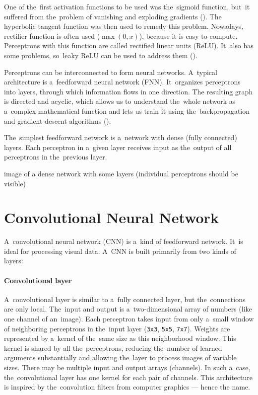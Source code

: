 One of the~first activation functions to be used was the~sigmoid function, but~it suffered from the~problem of vanishing and exploding gradients (\cite{VanishingGradient}). The hyperbolic tangent function was then used to remedy this problem. Nowadays, rectifier function is often used ($\max(0, x)$), because it is easy to compute. Perceptrons with this function are called rectified linear units (ReLU). It~also has some problems, so~leaky ReLU can be used to address them (\cite{Maas2013RectifierNI}).

Perceptrons can be interconnected to form neural networks. A~typical architecture is a~feedforward neural network (FNN). It~organizes perceptrons into layers, through which information flows in one direction. The resulting graph is directed and acyclic, which allows us to understand the~whole network as a~complex mathematical function and lets us train it using the~backpropagation and gradient descent algorithms (\cite{Goodfellow-et-al-2016}).

The~simplest feedforward network is a~network with dense (fully connected) layers. Each perceptron in a~given layer receives input as the~output of all perceptrons in the~previous layer.

\begin{code}
image of a dense network with some layers
(individual perceptrons should be visible)
\end{code}


\section{Convolutional Neural Network}

A~convolutional neural network (CNN) is a~kind of feedforward network. It~is ideal for processing visual data. A~CNN is built primarily from two kinds of layers:

\paragraph{Convolutional layer} A~convolutional layer is similar to a~fully connected layer, but the~connections are only local. The~input and output is a~two-dimensional array of numbers (like one channel of an~image). Each perceptron takes input from only a~small window of neighboring perceptrons in the~input layer (\texttt{3x3}, \texttt{5x5}, \texttt{7x7}). Weights are represented by a~kernel of the~same size as this neighborhood window. This kernel is shared by all the~perceptrons, reducing the~number of learned arguments substantially and allowing the~layer to process images of variable sizes. There may be multiple input and output arrays (channels). In such a~case, the~convolutional layer has one kernel for each pair of channels. This architecture is inspired by the~convolution filters from computer graphics --- hence the name.

